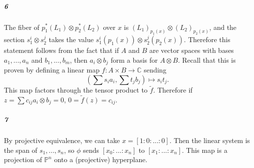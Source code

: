 \documentclass[10pt,letter]{article}
\begin{document}
\subparagraph{6} The fiber of $p_1^\ast(L_1) \otimes p_2^\ast(L_2)$ over $x$ is $(L_1)_{p_1(x)} \otimes (L_2)_{p_2(x)}$, and the section $s_1^i \otimes s_2^j$ takes the value $s_1^i(p_1(x)) \otimes s_2^j(p_2(x))$. Therefore this statement follows from the fact that if $A$ and $B$ are vector spaces with bases $a_1,...,a_n$ and $b_1,...,b_m$, then $a_i \otimes b_j$ form a basis for $A \otimes B$. Recall that this is proven by defining a linear map $f: A \times B \rightarrow \mathbb{C}$ sending \[(\sum s_i a_i, \sum t_j b_j) \mapsto s_i t_j.\] This map factors through the tensor product to $\tilde{f}$. Therefore if $z = \sum c_{ij} a_i \otimes b_j = 0$,  $0 = \tilde{f}(z) = c_{ij}$. 

\subparagraph{7} By projective equivalence, we can take $x = [1:0:...:0]$. Then the linear system is the span of $s_1,...,s_n$, so $\phi$ sends $[x_0:...:x_n]$ to $[x_1:...:x_n]$. This map is a projection of $\mathbb{P}^n$ onto a (projective) hyperplane. 
\end{document}
